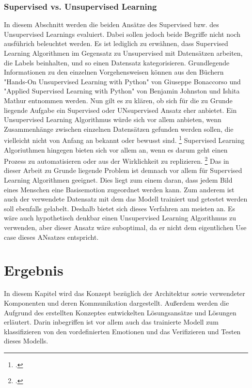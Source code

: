 \documentclass[12pt, a4paper]{scrbook}
\begin{document}
\subsection{Supervised vs. Unsupervised Learning}
In diesem Abschnitt werden die beiden Ansätze des Supervised bzw. des Unsupervised Learnings evaluiert. Dabei sollen jedoch beide Begriffe nicht noch ausführich beleuchtet werden. Es ist lediglich zu erwähnen, dass Supervised Learning Algorithmen im Gegensatz zu Unsupervised mit Datensätzen arbeiten, die Labels beinhalten, und so einen Datensatz kategorisieren.  Grundlegende Informationen zu den einzelnen Vorgehensweisen  können aus den Büchern "Hands-On Unsupervised Learning with Python" von Giuseppe Bonaccorso und "Applied Supervised Learning with Python" von Benjamin Johnston und Ishita Mathur entnommen werden.
Nun gilt es zu klären, ob sich für die zu Grunde liegende Aufgabe ein Supervised oder UNsupervised Ansatz eher anbietet. Ein Unsupervised Learning Algorithmus würde sich vor allem anbieten, wenn Zusammenhänge zwischen einzelnen Datensätzen gefunden werden sollen, die vielleicht nicht von Anfang an bekannt oder bewusst sind.
\footcite[Vgl. ][21]{Unsupervised}
 Supervised Learning Algoriuthmen hingegen bieten sich vor allem an, wenn es darum geht einen Prozess zu automatisieren oder aus der Wirklichkeit zu replizieren.
\footcite[Vgl. ][4]{Supervised}
Das in dieser Arbeit zu Grunde liegende Problem ist demnach vor allem für Supervised Learning Algorithmen geeignet. Dies liegt zum einem daran, dass jedem Bild eines Menschen eine Basisemotion zugeordnet werden kann. Zum anderem ist auch der verwendete Datensatz mit dem das Modell trainiert und getestet werden soll ebenfalls gelabelt. Deshalb bietet sich dieses Verfahren am meisten an. Es wäre auch hypothetisch denkbar einen Unsupervised Learning Algorithmus zu verwenden, aber dieser Ansatz wäre suboptimal, da er nicht dem eigentlichen Use case dieses ANsatzes entspricht.


\let\cleardoublepage\relax
\chapter{Ergebnis}
In diesem Kapitel wird das Konzept bezüglich der Architektur sowie verwendeter Komponenten und deren Kommunikation dargestellt. Außerdem werden die Aufgrund des erstellten Konzeptes entwickelten Lösungsansätze und Lösungen erläutert. Darin inbegriffen ist vor allem auch das trainierte Modell zum klassifizieren von den vordefinierten Emotionen und das Verifizieren und Testen dieses Modells.
\end{document}
